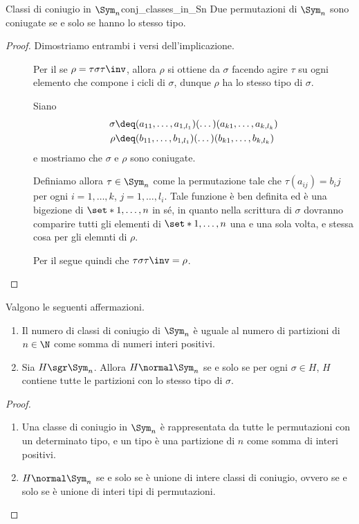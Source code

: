 \begin{theorem}
    {Classi di coniugio in $\Sym_n$}{conj_classes_in_Sn}
    Due permutazioni di $\Sym_n$ sono coniugate se e solo se hanno lo stesso tipo.
\end{theorem}
\begin{proof}
    Dimostriamo entrambi i versi dell'implicazione.
    \begin{description}
        \item[\boximpl] Per il  se $\rho = \tau\sigma\tau\inv$, allora $\rho$ si ottiene da $\sigma$ facendo agire $\tau$ su ogni elemento che compone i cicli di $\sigma$, dunque $\rho$ ha lo stesso tipo di $\sigma$.
        \item[\boximplby] Siano \begin{align*}
            \sigma &\deq (a_{11}, \dots, a_{1,l_1})(\dots)(a_{k1}, \dots, a_{k,l_k})\\
            \rho   &\deq (b_{11}, \dots, b_{1,l_1})(\dots)(b_{k1}, \dots, b_{k,l_k})
        \end{align*} e mostriamo che $\sigma$ e $\rho$ sono coniugate. 
        
        Definiamo allora $\tau \in \Sym_n$ come la permutazione tale che $\tau(a_{ij}) = b_ij$ per ogni $i = 1, \dots, k$, $j = 1, \dots, l_i$. Tale funzione è ben definita ed è una bigezione di $\set*{1, \dots, n}$ in sé, in quanto nella scrittura di $\sigma$ dovranno comparire tutti gli elementi di $\set*{1, \dots, n}$ una e una sola volta, e stessa cosa per gli elemnti di $\rho$.

        Per il  segue quindi che $\tau\sigma\tau\inv = \rho$. \qedhere 
    \end{description}
\end{proof}

\begin{corollary}{}{}
    Valgono le seguenti affermazioni.
    \begin{enumerate}[(1)]
        \item Il numero di classi di coniugio di $\Sym_n$ è uguale al numero di partizioni di $n \in \N$ come somma di numeri interi positivi.
        \item Sia $H \sgr \Sym_n$. Allora $H \normal \Sym_n$ se e solo se per ogni $\sigma \in H$, $H$ contiene tutte le partizioni con lo stesso tipo di $\sigma$. 
    \end{enumerate}
\end{corollary}
\begin{proof}
    \begin{enumerate}[(1)]
        \item Una classe di coniugio in $\Sym_n$ è rappresentata da tutte le permutazioni con un determinato tipo, e un tipo è una partizione di $n$ come somma di interi positivi.
        \item $H \normal \Sym_n$ se e solo se è unione di intere classi di coniugio, ovvero se e solo se è unione di interi tipi di permutazioni.
    \end{enumerate}
\end{proof}
